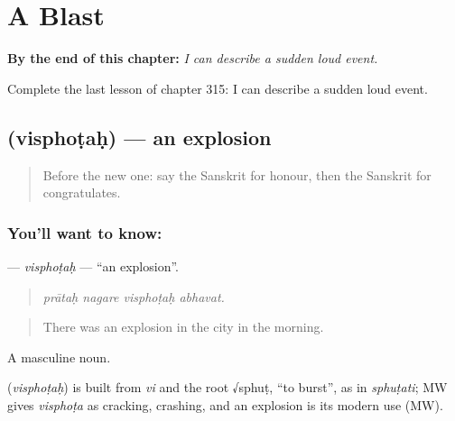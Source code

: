 
\chapter{A Blast}
\label{ch:sa-a-blast}

\begin{chapteropening}
\textbf{By the end of this chapter:} \emph{I can describe a sudden loud event.}

Complete the last lesson of chapter 315: I can describe a sudden loud event.
\end{chapteropening}

\section[\texorpdfstring{\sk{विस्फोटः} (visphoṭaḥ)}{विस्फोटः (visphoṭaḥ)}]{ (visphoṭaḥ) — an explosion}

\label{lesson:SA-C315-visphotah}



\begin{quote}
Before the new one: say the Sanskrit for honour, then the Sanskrit for congratulates.
\end{quote}

\subsection*{You'll want to know: }
\textbf{} — \emph{visphoṭaḥ} — \textquotedblleft{}an explosion\textquotedblright{}.

\begin{quote}
   
\end{quote}

\begin{quote}
\emph{prātaḥ nagare visphoṭaḥ abhavat.}
\end{quote}

\begin{quote}
There was an explosion in the city in the morning.
\end{quote}

A masculine noun.

\begin{cousinweb}
\textbf{} (\emph{visphoṭaḥ}) is built from \emph{vi} and the root √sphuṭ, \textquotedblleft{}to burst\textquotedblright{}, as in \emph{sphuṭati}; MW gives \emph{visphoṭa} as cracking, crashing, and an explosion is its modern use (MW).
\end{cousinweb}

